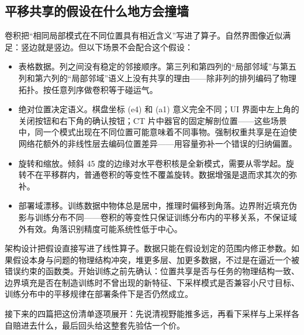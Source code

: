 \subsection{平移共享的假设在什么地方会撞墙}

卷积把``相同局部模式在不同位置具有相近含义''写进了算子。自然界图像近似满足：竖边就是竖边。但以下场景不会配合这个假设：

\begin{itemize}
\tightlist
\item
  表格数据。列之间没有稳定的邻接顺序。第三列和第四列的``局部邻域''与第五列和第六列的``局部邻域''语义上没有共享的理由——除非列的排列编码了物理拓扑。按任意列序做卷积等于碰运气。
\item
  绝对位置决定语义。棋盘坐标 (e4) 和 (a1) 意义完全不同；UI 界面中左上角的关闭按钮和右下角的确认按钮；CT 片中器官的固定解剖位置——这些场景中，同一个模式出现在不同位置可能意味着不同事物。强制权重共享是在迫使网络花额外的非线性层去编码位置差异——用容量弥补一个错误的归纳偏置。
\item
  旋转和缩放。倾斜 45 度的边缘对水平卷积核是全新模式，需要从零学起。旋转不在平移群内，普通卷积的等变性不覆盖旋转。数据增强是退而求其次的弥补。
\item
  部署域漂移。训练数据中物体总是居中，推理时偏移到角落。边界附近填充伪影与训练分布不同——卷积的等变性只保证训练分布内的平移关系，不保证域外有效。角落识别精度可能系统性低于中心。
\end{itemize}

架构设计把假设直接写进了线性算子。数据只能在假设划定的范围内修正参数。如果假设本身与问题的物理结构冲突，堆更多层、加更多数据，不过是在逼近一个被错误约束的函数类。开始训练之前先确认：位置共享是否与任务的物理结构一致、边界填充是否在制造训练时不曾出现的新特征、下采样模式是否兼容小尺寸目标、训练分布中的平移规律在部署条件下是否仍然成立。

接下来的四篇把这份清单逐项展开：先说清视野能推多远，再看下采样与上采样各自赔进去什么，最后回头给这整套先验估一个价。
